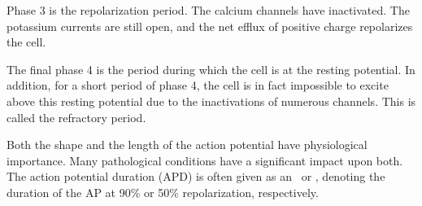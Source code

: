 Phase 3 is the repolarization period.
The calcium channels have inactivated.
The potassium currents are still open, and the net efflux of positive charge
repolarizes the cell.

The final phase 4 is the period during which the cell is at the resting
potential.
In addition, for a short period of phase 4, the cell is in fact
impossible to excite above this resting potential due to the inactivations of
numerous channels.
This is called the refractory period.

Both the shape and the length of the action potential have physiological
importance.
Many pathological conditions have a significant impact upon both.
The action potential duration (APD) is often given as an \apd\ or
\apd[50], denoting the duration of the AP at 90\% or 50\% repolarization,
respectively.
